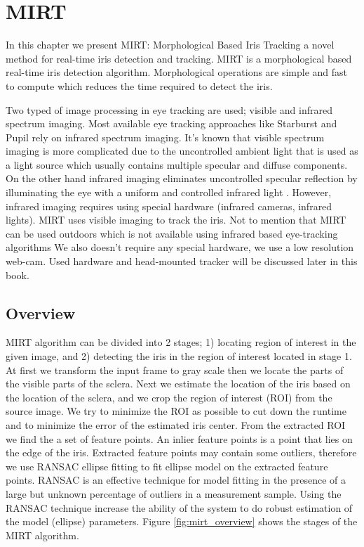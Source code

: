 
\chapter{MIRT} 
\label{ch_mirt}
In this chapter we present MIRT: Morphological Based Iris Tracking a novel method for real-time iris detection and tracking. MIRT is a morphological based real-time iris detection algorithm. Morphological operations are simple and fast to compute which reduces the time required to detect the iris. 

Two typed of image processing in eye tracking are used; visible and infrared spectrum imaging. Most available eye tracking approaches like Starburst \cite{starburst} and Pupil \cite{pupil} rely on infrared spectrum imaging. It's known that visible spectrum imaging is more complicated due to the uncontrolled ambient light that is used as a light source which usually contains multiple specular and diffuse components. On the other hand infrared imaging eliminates uncontrolled specular reflection by illuminating the eye with a uniform and controlled infrared light \cite{starburst}. However, infrared imaging requires using special hardware (infrared cameras, infrared lights). MIRT uses visible imaging to track the iris. Not to mention that MIRT can be used outdoors which is not available using infrared based eye-tracking algorithms We also doesn't require any special hardware, we use a low resolution web-cam. Used hardware and head-mounted tracker will be discussed later in this book.\bigskip


\section{Overview}
MIRT algorithm can be divided into 2 stages; 1) locating region of interest in the given image, and 2) detecting the iris in the region of interest located in stage 1. At first we transform the input frame to gray scale then we locate the parts of the visible parts of the sclera. Next we estimate the location of the iris based on the location of the sclera, and we crop the region of interest (ROI) from the source image. We try to minimize the ROI as possible to cut down the runtime and to minimize the error of the estimated iris center. From the extracted ROI we find the a set of feature points. An inlier feature points is a point that lies on the edge of the iris. Extracted feature points may contain some outliers, therefore we use RANSAC ellipse fitting to fit ellipse model on the extracted feature points. RANSAC is an effective technique for model fitting in the presence of a large but unknown percentage of outliers in a measurement sample. Using the RANSAC technique increase the ability of the system to do robust estimation of the model (ellipse) parameters. Figure \ref{fig:mirt_overview} shows the stages of the MIRT algorithm.

